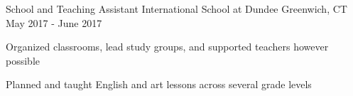 \begin{cventries}
  \cventry
  {School and Teaching Assistant}
  {International School at Dundee}
  {Greenwich, CT}
  {May 2017 - June 2017}
  {
    \begin{cvitems}
      \item{Organized classrooms, lead study groups, and supported teachers however possible}
      \item{Planned and taught English and art lessons across several grade levels}
    \end{cvitems}
  }
\end{cventries}
